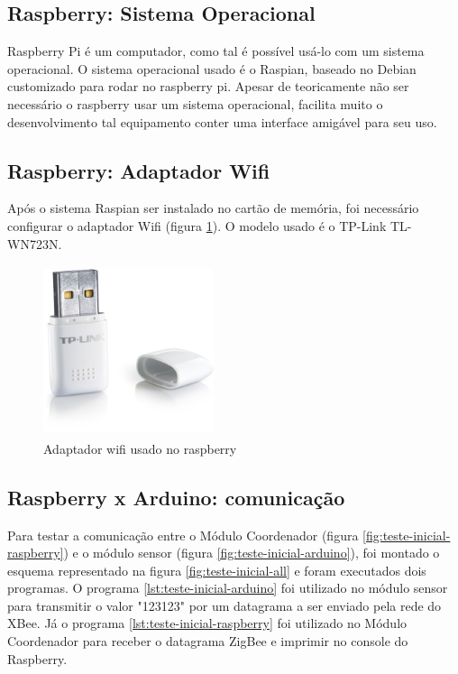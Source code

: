 \subsection{Raspberry: Sistema Operacional}

Raspberry Pi é um computador, como tal é possível usá-lo com um sistema operacional. O sistema operacional usado é o Raspian, baseado no Debian customizado para rodar no raspberry pi. Apesar de teoricamente não ser necessário o raspberry usar um sistema operacional, facilita muito o desenvolvimento tal equipamento conter uma interface amigável para seu uso.

\subsection{Raspberry: Adaptador Wifi}

Após o sistema Raspian ser instalado no cartão de memória, foi necessário configurar o adaptador Wifi (figura \ref{fig:wifi-adapter}). O modelo usado é o TP-Link TL-WN723N.

\begin{figure}[H]
\centering
\includegraphics[width=5cm,height=5cm,keepaspectratio]{figuras/wifi-adapter.jpg}
\caption{\label{fig:wifi-adapter} Adaptador wifi usado no raspberry}
\end{figure}

\subsection{Raspberry x Arduino: comunicação}

Para testar a comunicação entre o Módulo Coordenador (figura \ref{fig:teste-inicial-raspberry}) e o módulo sensor (figura \ref{fig:teste-inicial-arduino}), foi montado o esquema representado na figura \ref{fig:teste-inicial-all} e foram executados dois programas. O programa \ref{lst:teste-inicial-arduino} foi utilizado no módulo sensor para transmitir o valor "123123" por um datagrama a ser enviado pela rede do XBee. Já o programa \ref{lst:teste-inicial-raspberry} foi utilizado no Módulo Coordenador para receber o datagrama ZigBee e imprimir no console do Raspberry.

